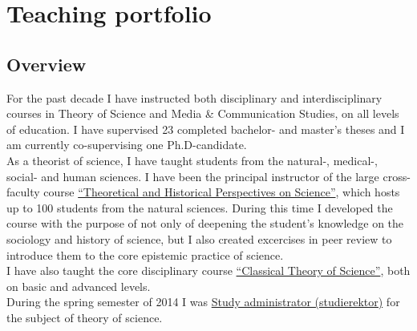 \documentclass[a4paper,11pt,oneside]{article}
\begin{document}
{%

\clearpage
\setlength\parindent{0cm}

\section{Teaching portfolio}

  \subsection{Overview}
  For the past decade I have instructed both disciplinary and interdisciplinary courses
  in Theory of Science and Media \& Communication Studies, on all levels of education.
  I have supervised 23 completed bachelor- and master's theses and I am currently
  co-supervising one Ph.D-candidate. \\

  As a theorist of science, I have taught students from the natural-,
  medical-, social- and human sciences. I have been the principal
  instructor of the large cross-faculty course  \href{http://files.christopherkullenberg.se/kursplaner/NTH001_Teoretiska_och_historiska_perspektiv_pa%cc%8a_naturvetenskap_10512.pdf}{``Theoretical and Historical Perspectives on Science''},
  which hosts up to 100 students from the natural sciences. During this time I
  developed the course with the purpose of not only of deepening the student's
  knowledge on the sociology and history of science, but I also created excercises
  in peer review to introduce them to the core epistemic practice of science.\\

  I have also taught the core disciplinary course \href{http://files.christopherkullenberg.se/kursplaner/VT2106_Klassisk_vetenskapsteori_13187.pdf}{``Classical Theory of Science''},
  both on basic and advanced levels. \\

  During the spring semester of 2014 I was \href{http://files.christopherkullenberg.se/studierektoronline.pdf}{Study administrator (studierektor)} for the subject of theory of science. \\

}
\end{document}
